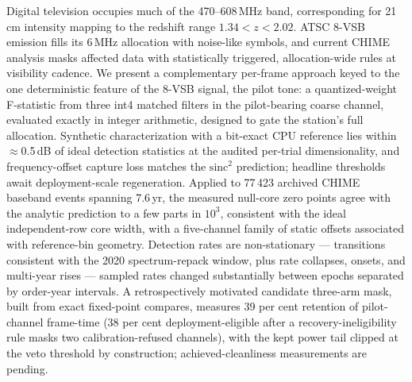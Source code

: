 Digital television occupies much of the 470--608\,MHz band,
corresponding for 21\,cm intensity mapping to the redshift range
$1.34 < z < 2.02$. ATSC 8-VSB emission fills its 6\,MHz allocation with
noise-like symbols, and current CHIME analysis masks affected data with
statistically triggered, allocation-wide rules at visibility cadence. We
present a complementary per-frame approach keyed to the one deterministic
feature of the 8-VSB signal, the pilot tone: a quantized-weight
F-statistic from three int4 matched filters in the pilot-bearing coarse
channel, evaluated exactly in integer arithmetic, designed to gate
the station's full allocation. Synthetic characterization with a
bit-exact CPU reference lies within $\approx$0.5\,dB of ideal detection
statistics at the audited per-trial dimensionality, and
frequency-offset capture loss matches the
$\mathrm{sinc}^2$ prediction; headline thresholds await deployment-scale
regeneration. Applied to 77\,423 archived CHIME
baseband events spanning 7.6\,yr, the measured null-core zero points
agree with the analytic prediction to a few parts in $10^{3}$, consistent
with the ideal independent-row core width, with a five-channel family of
static offsets associated with reference-bin geometry. Detection rates
are non-stationary --- transitions consistent with the 2020
spectrum-repack window, plus rate collapses, onsets, and multi-year rises
--- sampled rates changed substantially between epochs separated by
order-year intervals. A retrospectively motivated candidate three-arm mask, built from exact
fixed-point compares, measures 39 per cent
retention of pilot-channel frame-time (38 per cent deployment-eligible
after a recovery-ineligibility rule masks two calibration-refused
channels), with the kept power
tail clipped at the veto threshold by construction; achieved-cleanliness
measurements are pending.
